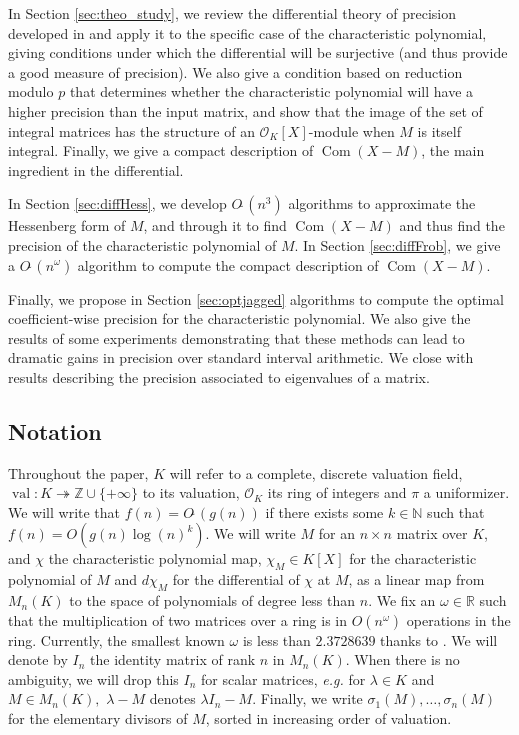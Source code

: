 \documentclass{sig-alternate-05-2015}
\DeclareMathOperator{\val}{val}
\DeclareMathOperator{\com}{Com}
\newcommand{\Z}{\mathbb Z}
\newcommand{\OK}{\mathcal{O}_K}
\newcommand{\softO}{O\tilde{~}}
\begin{document}
In Section \ref{sec:theo_study}, we review the differential
theory of precision developed in \cite{caruso-roe-vaccon:14a}
and apply it to the specific case of the characteristic polynomial,
giving conditions under which the differential will be surjective
(and thus provide a good measure of precision).  We also give
a condition based on reduction modulo $p$ that determines
whether the characteristic polynomial will have a higher
precision than the input matrix, and show that the image
of the set of integral matrices has the structure of an $\OK[X]$-module
when $M$ is itself integral. Finally, we give a compact description
of $\com(X-M)$, the main ingredient in the differential.

In Section \ref{sec:diffHess}, we develop $\softO(n^3)$ algorithms to approximate
the Hessenberg form of $M$, and through it to find $\com(X-M)$ and thus
find the precision of the characteristic polynomial of $M$.  In Section \ref{sec:diffFrob},
we give a $\softO(n^\omega)$ algorithm to compute the compact description of $\com(X-M)$.

Finally, we propose in Section \ref{sec:optjagged}
algorithms to compute the optimal coefficient-wise precision
for the characteristic polynomial.  We also give the results
of some experiments demonstrating that these methods can lead
to dramatic gains in precision over standard interval arithmetic.
We close with results describing the precision associated to
eigenvalues of a matrix.

\subsection*{Notation} Throughout the paper, $K$ will refer to a complete,
discrete valuation field, $\val : K \twoheadrightarrow \Z \cup \{+\infty\}$ to its valuation,
$\OK$ its ring of integers and $\pi$ a uniformizer. 
We will write that $f(n)=\softO (g(n))$ if there exists some
$k \in \mathbb{N}$ such that $f(n)=O(g(n) \log (n)^k).$
We will write $M$ for an $n \times n$ matrix over $K$,
and $\chi$ the characteristic polynomial map, $\chi_M \in K[X]$ for
the characteristic polynomial of $M$ and $d\chi_M$ for the differential
of $\chi$ at $M$, as a linear map from $M_n(K)$ to the space
of polynomials of degree less than $n$.
We fix an $\omega \in \mathbb{R}$ such that the multiplication
of two matrices over a ring is in $O(n^\omega)$ operations in the
ring. Currently, the smallest known $\omega$ is less than
$2.3728639 $ thanks to \cite{legall:14a}. 
We will denote by $I_n$ the identity matrix of rank $n$ in $M_n(K).$
When there is no ambiguity, we will drop this $I_n$
for scalar matrices, \textit{e.g.} for $\lambda \in K$
and $M \in M_n (K),$ $\lambda-M$ denotes $\lambda I_n - M.$
Finally, we write $\sigma_1(M), \dots, \sigma_n(M)$ for the
elementary divisors of $M$, sorted in increasing order of valuation.
\end{document}
